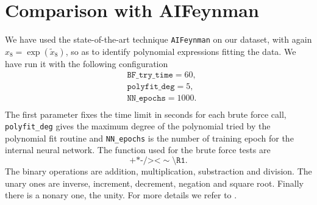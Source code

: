 \documentclass[11pt,a4paper]{article}
\begin{document}
\section{Comparison with AIFeynman} \label{app:AIFeynman}
We have used the state-of-the-art technique \texttt{AIFeynman} \cite{Udrescu:2019mnk} on our dataset, with again $x_8 = \exp(\tilde{x}_8)$, so as to identify polynomial expressions fitting the data. We have run it with the following configuration 
\begin{equation}
	\begin{aligned}
		&\texttt{BF\_try\_time} = 60, \\
		&\texttt{polyfit\_deg} = 5, \\
		&\texttt{NN\_epochs} = 1000.\\
	\end{aligned}
\end{equation}
The first parameter fixes the time limit in seconds for each brute force call, \texttt{polyfit\_deg} gives the maximum degree of the polynomial tried by the polynomial fit routine and \texttt{NN\_epochs} is the number of training epoch for the internal neural network. The function used for the brute force tests are 
\begin{equation}
\texttt{+*-/><} \sim \texttt{\textbackslash R1}.
\end{equation}
The binary operations are addition, multiplication, substraction and division. The unary ones are inverse, increment, decrement, negation and square root. Finally there is a nonary one, the unity. For more details we refer to \cite{Udrescu:2019mnk}.
\end{document}
